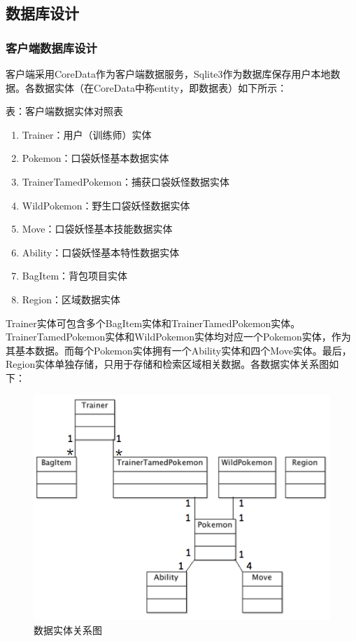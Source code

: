 \documentclass{article}
\begin{document}
\begin{CJK}{UTF8}{gbsn}
	\subsection{数据库设计}
	\subsubsection{客户端数据库设计}
  客户端采用CoreData作为客户端数据服务，Sqlite3作为数据库保存用户本地数据。各数据实体（在CoreData中称entity，即数据表）如下所示：

  表：客户端数据实体对照表
  \begin{enumerate}
		\item Trainer：用户（训练师）实体
		\item Pokemon：口袋妖怪基本数据实体
		\item TrainerTamedPokemon：捕获口袋妖怪数据实体
		\item WildPokemon：野生口袋妖怪数据实体
		\item Move：口袋妖怪基本技能数据实体
		\item Ability：口袋妖怪基本特性数据实体
		\item BagItem：背包项目实体
		\item Region：区域数据实体
  \end{enumerate}

  Trainer实体可包含多个BagItem实体和TrainerTamedPokemon实体。TrainerTamedPokemon实体和WildPokemon实体均对应一个Pokemon实体，作为其基本数据。而每个Pokemon实体拥有一个Ability实体和四个Move实体。最后，Region实体单独存储，只用于存储和检索区域相关数据。各数据实体关系图如下：

  \begin{figure}[htbp]
		\centering
		\includegraphics[bb=0 0 486 367, scale=0.45]{figure/fig_n08.png}
		\caption{数据实体关系图}
		\label{fig:n08}
	\end{figure}
  

\end{CJK}
\end{document}
